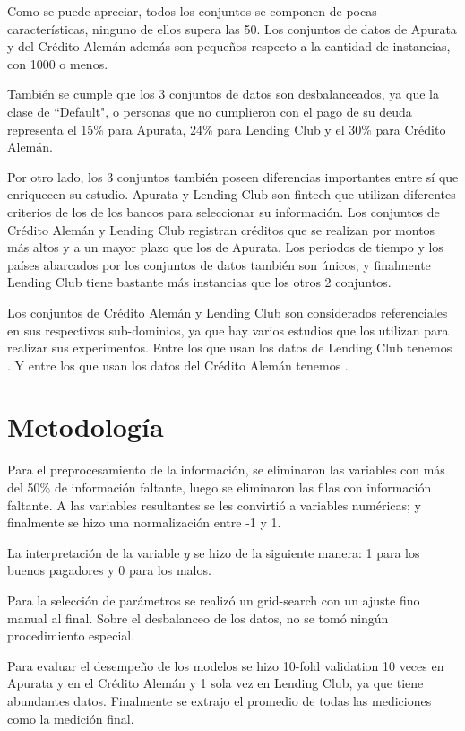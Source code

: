 Como se puede apreciar, todos los conjuntos se componen de pocas características, ninguno de ellos supera las 50. Los conjuntos de datos de Apurata y del Crédito Alemán además son pequeños respecto a la cantidad de instancias, con 1000 o menos.

También se cumple que los 3 conjuntos de datos son desbalanceados, ya que la clase de ``Default", o personas que no cumplieron con el pago de su deuda representa el 15\% para Apurata, 24\% para Lending Club y el 30\% para Crédito Alemán.

Por otro lado, los 3 conjuntos también poseen diferencias importantes entre sí que enriquecen su estudio. Apurata y Lending Club son fintech que utilizan diferentes criterios de los de los bancos para seleccionar su información. Los conjuntos de Crédito Alemán y Lending Club registran créditos que se realizan por montos más altos y a un mayor plazo que los de Apurata. Los periodos de tiempo y los países abarcados por los conjuntos de datos también son únicos, y finalmente Lending Club tiene bastante más instancias que los otros 2 conjuntos.

Los conjuntos de Crédito Alemán y Lending Club son considerados referenciales en sus respectivos sub-dominios, ya que hay varios estudios que los utilizan para realizar sus experimentos. Entre los que usan los datos de Lending Club tenemos \cite{malekipirbazari2015risk, zhang2016research, zang2014credit, tan2018deep}. Y entre los que usan los datos del Crédito Alemán tenemos \cite{harris2015credit, nanni2009experimental, brown2012experimental, wang2012two}.

\section{Metodología}

Para el preprocesamiento de la información, se eliminaron las variables con más del 50\% de información faltante, luego se eliminaron las filas con información faltante. A las variables resultantes se les convirtió a variables numéricas; y finalmente se hizo una normalización entre -1 y 1.

La interpretación de la variable $y$ se hizo de la siguiente manera: 1 para los buenos pagadores y 0 para los malos.

Para la selección de parámetros se realizó un grid-search con un ajuste fino manual al final. Sobre el desbalanceo de los datos, no se tomó ningún procedimiento especial. 

Para evaluar el desempeño de los modelos se hizo 10-fold validation 10 veces en Apurata y en el Crédito Alemán y 1 sola vez en Lending Club, ya que tiene abundantes datos. Finalmente se extrajo el promedio de todas las mediciones como la medición final. 

